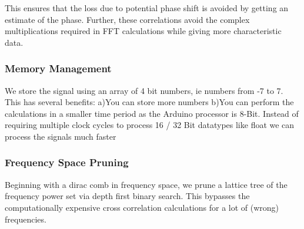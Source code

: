 This ensures that the loss due to potential phase shift is avoided by getting an
estimate of the phase. Further, these correlations avoid the complex
multiplications required in FFT calculations while giving more characteristic
data. 

\subsubsection{Memory Management}
We store the signal using an array of 4 bit numbers, ie numbers from -7 to 7.
This has several benefits: a)You can store more numbers b)You can perform the
calculations in a smaller time period as the Arduino processor is 8-Bit. Instead
of requiring multiple clock cycles to process 16 / 32 Bit datatypes like float
we can process the signals much faster 

\subsubsection{Frequency Space Pruning}
Beginning with a dirac comb in frequency space, we prune a lattice tree of the
frequency power set via depth first binary search. This bypasses the
computationally expensive cross correlation calculations for a lot of (wrong)
frequencies. 